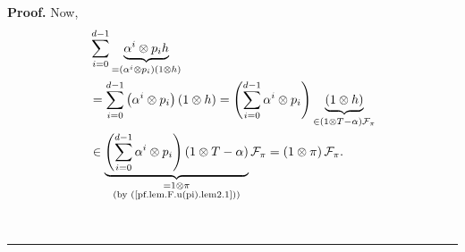 \documentclass[numbers=enddot,12pt,final,onecolumn,notitlepage]{scrartcl}%
\theoremstyle{definition}
\newenvironment{proof}[1][Proof]{\noindent\textbf{#1.} }{\ \rule{0.5em}{0.5em}}
\let\sumnonlimits\sum
\renewcommand{\sum}{\sumnonlimits\limits}
\begin{document}
\begin{proof}
Now,
\begin{align}
&  \sum_{i=0}^{d-1}\underbrace{\alpha^{i}\otimes p_{i}h}_{=\left(  \alpha
^{i}\otimes p_{i}\right)  \left(  1\otimes h\right)  }\nonumber\\
&  =\sum_{i=0}^{d-1}\left(  \alpha^{i}\otimes p_{i}\right)  \left(  1\otimes
h\right)  =\left(  \sum_{i=0}^{d-1}\alpha^{i}\otimes p_{i}\right)
\underbrace{\left(  1\otimes h\right)  }_{\in\left(  1\otimes T-\alpha\right)
\mathcal{F}_{\pi}}\nonumber\\
&  \in\underbrace{\left(  \sum_{i=0}^{d-1}\alpha^{i}\otimes p_{i}\right)
\left(  1\otimes T-\alpha\right)  }_{\substack{=1\otimes\pi\\\text{(by
(\ref{pf.lem.F.u(pi).lem2.1}))}}}\mathcal{F}_{\pi}=\left(  1\otimes\pi\right)
\mathcal{F}_{\pi}. \label{pf.lem.F.u(pi).lem2.3}%
\end{align}



\end{proof}
\end{document}
